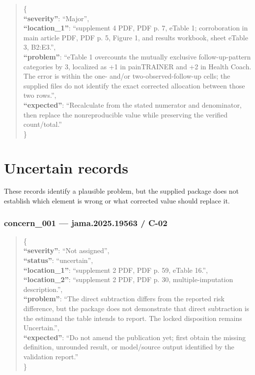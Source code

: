 \documentclass[
  letterpaper,
  9pt]{extreport}
\begin{document}
\begin{quote}
\{\\
\textbf{``severity''}: ``Major'',\\
\textbf{``location\_1''}: ``supplement 4 PDF, PDF p. 7, eTable 1;
corroboration in main article PDF, PDF p. 5, Figure 1, and results
workbook, sheet eTable 3, B2:E3.'',\\
\textbf{``problem''}: ``eTable 1 overcounts the mutually exclusive
follow-up-pattern categories by 3, localized as +1 in painTRAINER and +2
in Health Coach. The error is within the one- and/or
two-observed-follow-up cells; the supplied files do not identify the
exact corrected allocation between those two rows.'',\\
\textbf{``expected''}: ``Recalculate from the stated numerator and
denominator, then replace the nonreproducible value while preserving the
verified count/total.''\\
\}
\end{quote}

\hypertarget{uncertain-records}{%
\chapter{Uncertain records}\label{uncertain-records}}

These records identify a plausible problem, but the supplied package
does not establish which element is wrong or what corrected value should
replace it.

\hypertarget{concern_001--jama202519563--c-02}{%
\subsection{concern\_001 --- jama.2025.19563 /
C-02}\label{concern_001--jama202519563--c-02}}

\begin{quote}
\{\\
\textbf{``severity''}: ``Not assigned'',\\
\textbf{``status''}: ``uncertain'',\\
\textbf{``location\_1''}: ``supplement 2 PDF, PDF p. 59, eTable 16.'',\\
\textbf{``location\_2''}: ``supplement 2 PDF, PDF p. 30,
multiple-imputation description.'',\\
\textbf{``problem''}: ``The direct subtraction differs from the reported
risk difference, but the package does not demonstrate that direct
subtraction is the estimand the table intends to report. The locked
disposition remains Uncertain.'',\\
\textbf{``expected''}: ``Do not amend the publication yet; first obtain
the missing definition, unrounded result, or model/source output
identified by the validation report.''\\
\}
\end{quote}
\end{document}
